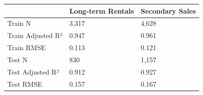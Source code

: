 \begin{tabular}{lll}
\toprule
 & Long-term Rentals & Secondary Sales \\
\midrule
Train N & 3,317 & 4,628 \\
Train Adjusted R² & 0.947 & 0.961 \\
Train RMSE & 0.113 & 0.121 \\
Test N & 830 & 1,157 \\
Test Adjusted R² & 0.912 & 0.927 \\
Test RMSE & 0.157 & 0.167 \\
\bottomrule
\end{tabular}
